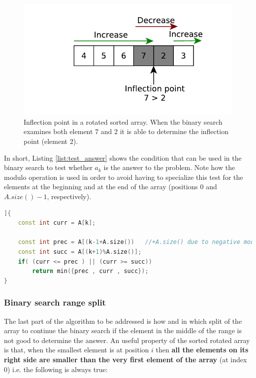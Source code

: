 \begin{figure}
	\centering
	\includegraphics{sources/min_rotated_array/images/inflection_point}
	\caption{Inflection point in a rotated sorted array. When the binary search examines both element $7$ and $2$ it is able to determine the inflection point (element $2$). }
	\label{fig:min_rotated_array:test_element}
\end{figure}

In short, Listing \ref{list:test_answer} shows the condition that can be used in the binary search to test whether $a_k$ is the answer to the problem. Note how the modulo operation is used in order to avoid having to specialize this test for the elements at the beginning and at the end of the array (positions $0$ and $A.size()-1$, respectively).

\begin{lstlisting}[language=c++, caption={Test to verify whether the binary search can stop because an answer has been found.},label=list:test_answer]]{
	const int curr = A[k];

	const int prec = A[(k-1+A.size()) 	//+A.size() due to negative modulo
	const int succ = A[(k+1)%A.size()];
	if( (curr <= prec ) || (curr >= succ))
		return min({prec , curr , succ});
}
\end{lstlisting}

\subsubsection{Binary search range split}

The last part of the algorithm to be addressed is how and in which split of the array to continue the binary search if the element in the middle of the range is not good to determine the answer. An useful property of the sorted rotated array is that, when the smallest element is at position $i$ then \textbf{all the elements on its right side are smaller than the very first element of the array} (at index $0$) i.e. the following is always true:

